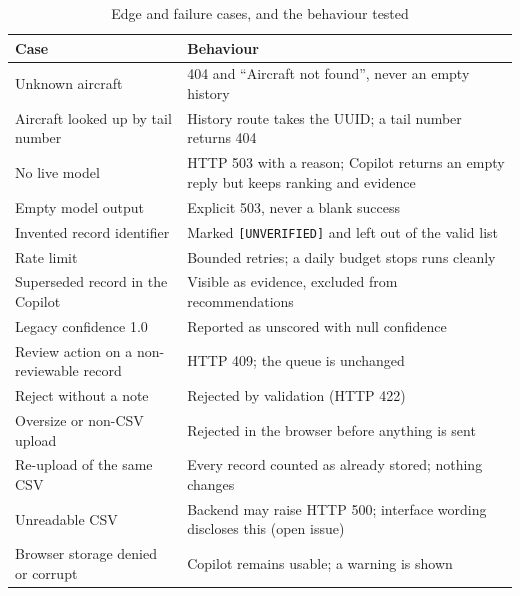 \begin{table}[H]
\centering
\caption{Edge and failure cases, and the behaviour tested}
\label{tab:edge-cases}
\small
\begin{tabularx}{\textwidth}{@{}>{\raggedright\arraybackslash}p{} L@{}}
\toprule
Case & Behaviour \\
\midrule
Unknown aircraft & 404 and ``Aircraft not found'', never an empty history \\
Aircraft looked up by tail number & History route takes the UUID; a tail number returns 404 \\
No live model & HTTP 503 with a reason; Copilot returns an empty reply but keeps ranking and evidence \\
Empty model output & Explicit 503, never a blank success \\
Invented record identifier & Marked \texttt{[UNVERIFIED]} and left out of the valid list \\
Rate limit & Bounded retries; a daily budget stops runs cleanly \\
Superseded record in the Copilot & Visible as evidence, excluded from recommendations \\
Legacy confidence 1.0 & Reported as unscored with null confidence \\
Review action on a non-reviewable record & HTTP 409; the queue is unchanged \\
Reject without a note & Rejected by validation (HTTP 422) \\
Oversize or non-CSV upload & Rejected in the browser before anything is sent \\
Re-upload of the same CSV & Every record counted as already stored; nothing changes \\
Unreadable CSV & Backend may raise HTTP 500; interface wording discloses this (open issue) \\
Browser storage denied or corrupt & Copilot remains usable; a warning is shown \\
\bottomrule
\end{tabularx}
\end{table}
